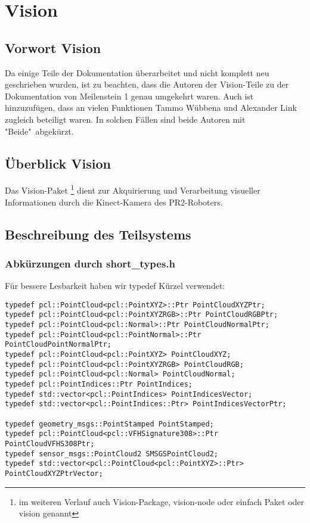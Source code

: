 \documentclass{suturo}
\begin{document}
\section{Vision}
\subsection{Vorwort Vision}
Da einige Teile der Dokumentation überarbeitet und nicht komplett neu geschrieben wurden, ist zu beachten, dass die Autoren der Vision-Teile zu der Dokumentation von Meilenstein 1 genau umgekehrt waren. Auch ist hinzuzufügen, dass an vielen Funktionen Tammo Wübbena und Alexander Link zugleich beteiligt waren. In solchen Fällen sind beide Autoren mit "Beide"\ abgekürzt.

\subsection{Überblick Vision}
Das Vision-Paket \footnote{im weiteren Verlauf auch Vision-Package, vision-node oder einfach Paket oder vision genannt} dient zur Akquirierung und Verarbeitung visueller Informationen durch die Kinect-Kamera des PR2-Roboters.

\begin{figure}[!htb]
\end{figure}
      
\subsection{Beschreibung des Teilsystems}

\subsubsection{Abkürzungen durch short\_types.h}
Für bessere Lesbarkeit haben wir typedef Kürzel verwendet:
\begin{verbatim}
typedef pcl::PointCloud<pcl::PointXYZ>::Ptr PointCloudXYZPtr;
typedef pcl::PointCloud<pcl::PointXYZRGB>::Ptr PointCloudRGBPtr;
typedef pcl::PointCloud<pcl::Normal>::Ptr PointCloudNormalPtr;
typedef pcl::PointCloud<pcl::PointNormal>::Ptr PointCloudPointNormalPtr;
typedef pcl::PointCloud<pcl::PointXYZ> PointCloudXYZ;
typedef pcl::PointCloud<pcl::PointXYZRGB> PointCloudRGB;
typedef pcl::PointCloud<pcl::Normal> PointCloudNormal;
typedef pcl::PointIndices::Ptr PointIndices;
typedef std::vector<pcl::PointIndices> PointIndicesVector;
typedef std::vector<pcl::PointIndices::Ptr> PointIndicesVectorPtr;

typedef geometry_msgs::PointStamped PointStamped;
typedef pcl::PointCloud<pcl::VFHSignature308>::Ptr PointCloudVFHS308Ptr;
typedef sensor_msgs::PointCloud2 SMSGSPointCloud2;
typedef std::vector<pcl::PointCloud<pcl::PointXYZ>::Ptr> PointCloudXYZPtrVector;
\end{verbatim}
\end{document}

